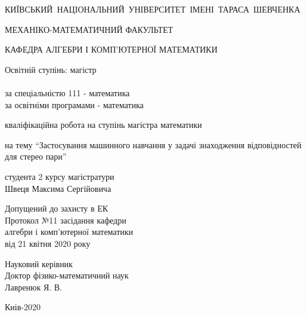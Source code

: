 \documentclass[11pt]{article}
\theoremstyle{definition}
\begin{document}
\begin{titlepage}
	{
		\centering \mbox{КИЇВСЬКИЙ НАЦІОНАЛЬНИЙ УНІВЕРСИТЕТ ІМЕНІ ТАРАСА ШЕВЧЕНКА}
		
		\centering МЕХАНІКО-МАТЕМАТИЧНИЙ ФАКУЛЬТЕТ
		
		\centering КАФЕДРА АЛГЕБРИ І КОМП’ЮТЕРНОЇ МАТЕМАТИКИ
		
	}
	
	\vspace{30pt}

	\noindent
	Освітній ступінь: магістр \\ \\
	за спеціальністю 111 - математика \\
	за освітніми програмами - математика
	
	\vspace{30pt}
	
	{
		\noindent \centering кваліфікаційна робота на ступінь магістра математики
		
		\noindent \centering на тему “Застосування машинного навчання у задачі знаходження відповідностей для стерео пари”
		
	}
	
	\vspace{30pt}
	
	\begin{flushright}
		студента 2 курсу магістратури \\
		Швеця Максима Сергійовича
	\end{flushright}

	\vspace{30pt}

	\noindent
	Допущений до захисту в ЕК \\
	Протокол №11 засідання кафедри \\
	алгебри і комп’ютерної математики \\
	від 21 квітня 2020 року
	
	\vspace{30pt}
	
	\begin{flushright}
		Науковий керівник \\
		Доктор фізико-математичний наук \\
		Лавренюк Я. В.
	\end{flushright}

	\vspace*{\fill}
	\centering Киів-2020
\end{titlepage}

\newpage
\end{document}
